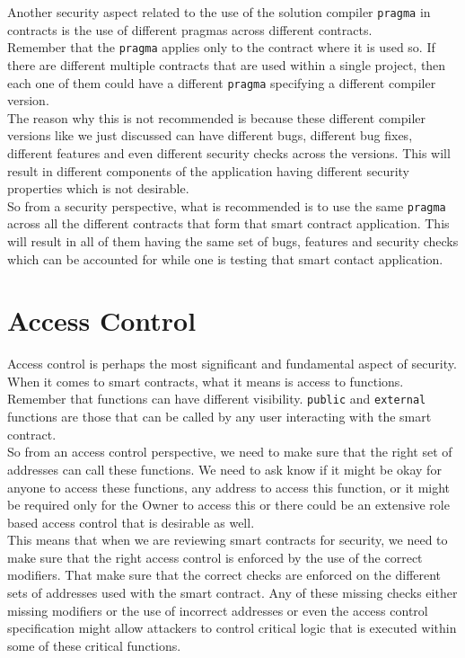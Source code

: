 Another security aspect related to the use of the solution compiler \texttt{pragma} in contracts is the use of different pragmas across different contracts.\\

Remember that the \texttt{pragma} applies only to the contract where it is used so. If there are different multiple contracts that are used within a single project, then each one of them could have a different \texttt{pragma} specifying a different compiler version.\\

The reason why this is not recommended is because these different compiler versions like we just discussed can have different bugs, different bug fixes, different features and even different security checks across the versions. This will result in different components of the application having different security properties which is not desirable.\\

So from a security perspective, what is recommended is to use the same \texttt{pragma} across all the different contracts that form that smart contract application. This will result in all of them having the same set of bugs, features and security checks which can be accounted for while one is testing that smart contact application.

\section{Access Control}

Access control is perhaps the most significant and fundamental aspect of security. When it comes to smart contracts, what it means is access to functions.\\

Remember that functions can have different visibility. \texttt{public} and \texttt{external} functions are those that can be called by any user interacting with the smart contract.\\

So from an access control perspective, we need to make sure that the right set of addresses can call these functions. We need to ask know if it might be okay for anyone to access these functions, any address to access this function, or it might be required only for the Owner to access this or there could be an extensive role based access control that is desirable as well.\\

This means that when we are reviewing smart contracts for security, we need to make sure that the right access control is enforced by the use of the correct modifiers. That make sure that the correct checks are enforced on the different sets of addresses used with the smart contract. Any of these missing checks either missing modifiers or the use of incorrect addresses or even the access control specification might allow attackers to control critical logic that is executed within some of these critical functions.\\

